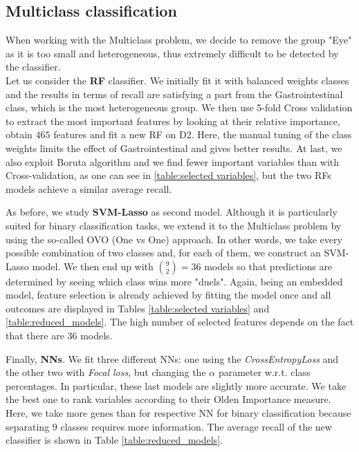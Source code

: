 \documentclass[a4paper,11pt, oneside]{article}  %
\begin{document}
\subsection{Multiclass classification}
When working with the Multiclass problem, we decide to remove the group "Eye" as it is too small and heterogeneous,  thus extremely difficult to be detected by the classifier.  \\

Let us consider the \textbf{RF}  classifier. We initially fit it with balanced weights classes and the results in terms of recall are satisfying a part from the Gastrointestinal class,  which is the most heterogeneous group.  We then use 5-fold Cross validation to extract the most important features by looking at their relative importance,  obtain $465$ features and fit a new RF on D2.  Here,  the manual tuning of the class weights limits the effect of Gastrointestinal and gives better results.  At last, we also exploit Boruta algorithm and we find fewer important variables than with Cross-validation,  as one can see in \ref{table:selected variables},  but the two RFs models achieve a similar average recall.

As before, we study \textbf{SVM-Lasso} as second model.  Although it is particularly suited for binary classification tasks, we extend it to the Multiclass problem by using the so-called OVO (One vs One) approach. In other words, we take every possible combination of two classes and, for each of them, we construct an SVM-Lasso model. We then end up with $ \binom{9}{2} = 36$ models so that predictions are determined by seeing which class wins more "duels". Again,  being an embedded model, feature selection is already achieved by fitting the model once and all outcomes are displayed in Tables \ref{table:selected variables} and \ref{table:reduced_models}. The high number of selected features depends on the fact that there are 36 models.  

Finally, \textbf{NNs}. We fit three different NNs: one using the \textit{CrossEntropyLoss} and the other two with \textit{Focal loss}, but changing the $\alpha$ parameter w.r.t. class percentages. In particular, these last models are slightly more accurate. We take the best one to rank variables according to their Olden Importance measure. Here, we take more genes than for respective NN for binary classification because separating $9$ classes requires more information. The average recall of the new classifier is shown in Table \ref*{table:reduced_models}.
\end{document}
